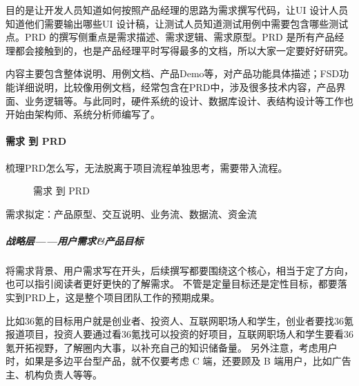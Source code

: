 \documentclass[letterpaper,10pt,english]{sphinxmanual}
\begin{document}
目的是让开发人员知道如何按照产品经理的思路为需求撰写代码，让UI
设计人员知道他们需要输出哪些UI
设计稿，让测试人员知道测试用例中需要包含哪些测试点。PRD
的撰写侧重点是需求描述、需求逻辑、需求原型。PRD
是所有产品经理都会接触到的，也是产品经理平时写得最多的文档，所以大家一定要好好研究。

内容主要包含整体说明、用例文档、产品Demo等，对产品功能具体描述；FSD功能详细说明，比较像用例文档，经常包含在PRD中，涉及很多技术内容，产品界面、业务逻辑等。与此同时，硬件系统的设计、数据库设计、表结构设计等工作也开始由架构师、系统分析师编写了。
%
\begin{footnote}[564]\sphinxAtStartFootnote
{}
%
\end{footnote}


\paragraph{需求 到 PRD}
\label{\detokenize{chapter_knowledge/PRD:id2}}
梳理PRD怎么写，无法脱离于项目流程单独思考，需要带入流程。

\begin{figure}[H]
\centering
\capstart

\noindent{}
\caption{需求 到 PRD
\sphinxfootnotemark[565]}\label{\detokenize{chapter_knowledge/PRD:id31}}\end{figure}
%
\begin{footnotetext}[565]\sphinxAtStartFootnote
{}
%
\end{footnotetext}\ignorespaces 
需求拟定：产品原型、交互说明、业务流、数据流、资金流


\subparagraph{战略层——用户需求\&产品目标}
\label{\detokenize{chapter_knowledge/PRD:id3}}
将需求背景、用户需求写在开头，后续撰写都要围绕这个核心，相当于定了方向，也可以指引阅读者更好更快的了解需求。
不管是定量目标还是定性目标，都要落实到PRD上，这是整个项目团队工作的预期成果。

比如36氪的目标用户就是创业者、投资人、互联网职场人和学生，创业者要找36氪报道项目，投资人要通过看36氪找可以投资的好项目，互联网职场人和学生要看36氪开拓视野，了解圈内大事，以补充自己的知识储备量。
另外注意，考虑用户时，如果是多边平台型产品，就不仅要考虑 C 端，还要顾及
B 端用户，比如广告主、机构负责人等等。
\end{document}
